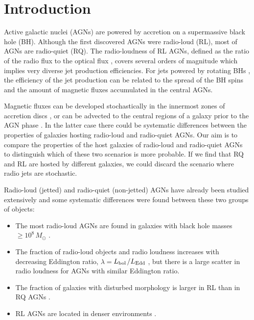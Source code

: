 \documentclass[utf8]{frontiersSCNS}
\newcommand{\Lbol}{$L_{\rm bol}$}
\begin{document}
\section{Introduction}
Active galactic nuclei (AGNs) are powered by accretion on a supermassive black hole (BH). Although the first discovered AGNs were radio-loud (RL), most of AGNs are radio-quiet (RQ). The radio-loudness of RL AGNs, defined as the ratio of the radio flux to the optical flux \citep{Kellermann.etal.1989a}, covers several orders of magnitude \citep[e.g.][]{Sikora.Stawarz.Lasota.2007a,Lal.Ho.2010a} which implies very diverse jet production efficiencies. For jets powered by rotating BHs \citep{1977MNRAS.179..433B}, the efficiency of the jet production can be related to the spread of the BH spins and the amount of magnetic fluxes accumulated in the central AGNs.

Magnetic fluxes can be developed stochastically in the innermost zones of accretion discs \citep{2014ApJ...782L..18B}, or can be advected to the central regions of a galaxy prior to the AGN phase \citep{Sikora.etal.2013a,Sikora.Begelman.2013a}. In the latter case there could be systematic differences between the properties of galaxies hosting radio-loud and radio-quiet AGNs. Our aim is to compare the properties of the host galaxies of radio-loud and radio-quiet AGNs to distinguish which of these two scenarios is more probable. If we find that RQ and RL are hosted by different galaxies, we could discard the scenario where radio jets are stochastic.

Radio-loud (jetted) and radio-quiet (non-jetted) AGNs have already been studied extensively and some systematic differences were found between these two groups of objects:
\begin{itemize}
\item The most radio-loud AGNs are found in galaxies with black hole masses $\ge 10^8\, M_{\odot}$ \citep{Laor2000a,Dunlop.etal.2003a,Floyd.etal.2004a,McLure.Jarvis.2004a,Best.etal.2005a}.
\item The fraction of radio-loud objects and radio loudness increases with decreasing Eddington ratio, $\lambda=$\Lbol$/L_{\rm Edd}$  \citep[e.g.][]{Kratzer.Richards.2015a,Terashima.Wilson.2003a}, but there is a large scatter in radio loudness for AGNs with similar Eddington ratio.
\item The fraction of galaxies with disturbed morphology is larger in RL than in RQ AGNs \citep{Bessiere.etal.2012a,Chiaberge.etal.2015a}.
\item RL AGNs are located in denser environments \citep[e.g.][]{Mandelbaum.etal.2009a,RamosAlmeida.etal.2013a}.  
\end{itemize}
\end{document}
